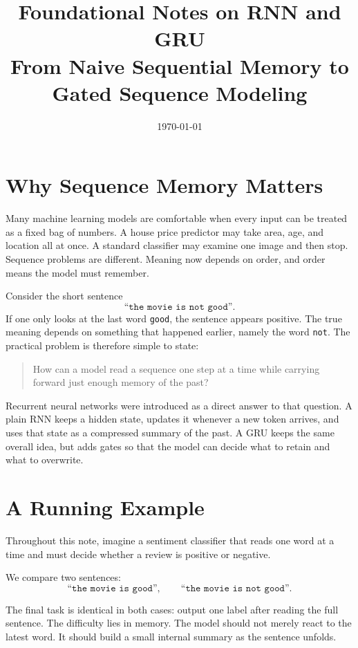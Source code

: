 \documentclass[12pt,a4paper]{article}
\title{Foundational Notes on RNN and GRU\\
\large From Naive Sequential Memory to Gated Sequence Modeling}
\author{}
\date{\today}
\begin{document}
\maketitle
\tableofcontents

\section{Why Sequence Memory Matters}

Many machine learning models are comfortable when every input can be treated as a fixed bag of numbers. A house price predictor may take area, age, and location all at once. A standard classifier may examine one image and then stop. Sequence problems are different. Meaning now depends on order, and order means the model must remember.

Consider the short sentence
\[
\texttt{``the movie is not good''}.
\]
If one only looks at the last word \texttt{good}, the sentence appears positive. The true meaning depends on something that happened earlier, namely the word \texttt{not}. The practical problem is therefore simple to state:
\begin{quote}
How can a model read a sequence one step at a time while carrying forward just enough memory of the past?
\end{quote}

Recurrent neural networks were introduced as a direct answer to that question. A plain RNN keeps a hidden state, updates it whenever a new token arrives, and uses that state as a compressed summary of the past. A GRU keeps the same overall idea, but adds gates so that the model can decide what to retain and what to overwrite.

\section{A Running Example}

Throughout this note, imagine a sentiment classifier that reads one word at a time and must decide whether a review is positive or negative.

We compare two sentences:
\[
\texttt{``the movie is good''},
\qquad
\texttt{``the movie is not good''}.
\]

The final task is identical in both cases: output one label after reading the full sentence. The difficulty lies in memory. The model should not merely react to the latest word. It should build a small internal summary as the sentence unfolds.
\end{document}
